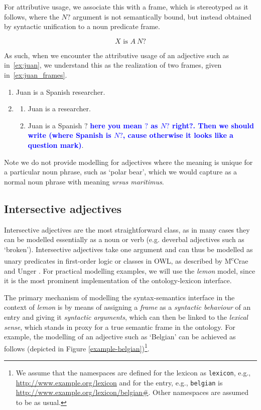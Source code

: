 \documentclass[11pt]{article}
\begin{document}
For attributive usage, we associate this with a frame, which is stereotyped as it follows,
where the $N?$ argument is not semantically bound, but instead obtained by
syntactic unification to a noun predicate frame.

\vspace{-1.0em}
$$X\text{ is }A~N?$$
\vspace{-1.5em}

As such, when we encounter the attributive usage of an adjective such as in~\ref{ex:juan}, 
we understand this as the realization of two frames, given in~\ref{ex:juan_frames}.

\begin{enumerate}
\item Juan is a Spanish researcher. \label{ex:juan}
\item \begin{enumerate}
\item Juan is a researcher.
\item Juan is a Spanish $?$ \textbf{\textcolor{blue}{here you mean $?$ as $N?$ right?. Then we should write (where Spanish is $N?$, cause otherwise it looks like a question mark)}}.
\end{enumerate}
\label{ex:juan_frames}
\end{enumerate}

Note we do not provide modelling for adjectives where the meaning is unique for a particular noun phrase,
such as `polar bear', which we would capture as a normal noun phrase with 
meaning \emph{ursus maritimus}.

\subsection{Intersective adjectives} \label{sec:intersectives}

Intersective adjectives are the most straightforward class, as in many cases they 
can be modelled essentially as a noun or verb (e.g. deverbal adjectives such as `broken'). Intersective 
adjectives take one argument and can thus be modelled as unary predicates in first-order logic or classes in OWL, as described by M\textsuperscript{c}Crae and Unger . For practical modelling examples, we will use the
\emph{lemon} model, since it is the most prominent implementation of the 
ontology-lexicon interface.

The primary mechanism of modelling the syntax-semantics interface in the context 
of \emph{lemon} is by means of assigning a \emph{frame} as a \emph{syntactic 
behaviour} of an entry and giving it \emph{syntactic arguments}, which can then 
be linked to the \emph{lexical sense}, which stands in proxy for a true semantic 
frame in the ontology. For example, the modelling of an adjective such as 
`Belgian' can be achieved as follows (depicted in Figure 
\ref{example-belgian})\footnote{We assume that the namespaces are defined for 
the lexicon as {\tt lexicon}, e.g., \url{http://www.example.org/lexicon}
and for the entry, e.g., {\tt belgian} is \url{http://www.example.org/lexicon/belgian#}.
Other namespaces are assumed to be as usual.}.
\end{document}
